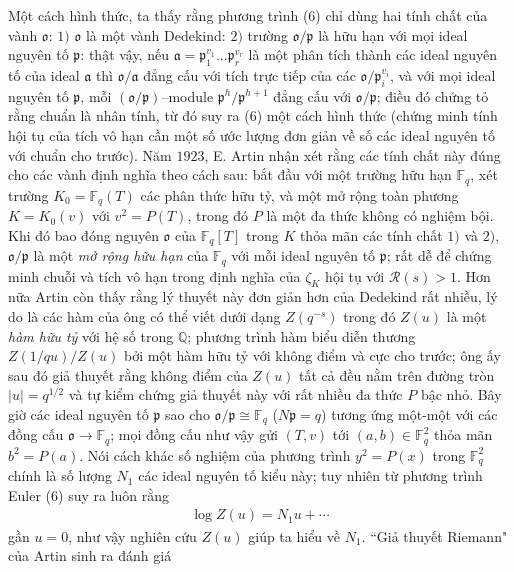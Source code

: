 \begin{multicols}{2}
	\vskip 0.1cm
	Một cách hình thức, ta thấy rằng phương trình ($6$) chỉ dùng hai tính chất của vành $\mathfrak{o}$: $1)$ $\mathfrak{o}$ là một vành Dedekind: $2)$ trường $\mathfrak{o}/\mathfrak{p}$ là hữu hạn với mọi ideal nguyên tố $\mathfrak{p}$: thật vậy, nếu $\mathfrak{a} = \mathfrak{p}_1^{v_1}...\mathfrak{p}_r^{v_r}$ là một phân tích thành các ideal nguyên tố của ideal $\mathfrak{a}$ thì $\mathfrak{o}/\mathfrak{a}$ đẳng cấu với tích trực tiếp của các $\mathfrak{o}/\mathfrak{p}_i^{v_i}$, và với mọi ideal nguyên tố $\mathfrak{p}$, mỗi $(\mathfrak{o}/\mathfrak{p})$--module $\mathfrak{p}^h/\mathfrak{p}^{h+1}$ đẳng cấu với $\mathfrak{o}/\mathfrak{p}$; điều đó chứng tỏ rằng chuẩn là nhân tính, từ đó suy ra ($6$) một cách hình thức (chứng minh tính hội tụ của tích vô hạn cần một số ước lượng đơn giản về số các ideal nguyên tố với chuẩn cho trước). Năm $1923$, E. Artin nhận xét rằng các tính chất này đúng cho các vành định nghĩa theo cách sau: bắt đầu với một trường hữu hạn $\mathbb{F}_q$, xét trường $K_0 = \mathbb{F}_q(T)$ các phân thức hữu tỷ, và một mở rộng toàn phương $K = K_0(v)$ với $v^2=P(T)$, trong đó $P$ là một đa thức không có nghiệm bội. Khi đó bao đóng nguyên $\mathfrak{o}$ của $\mathbb{F}_q[T]$ trong $K$ thỏa mãn các tính chất $1)$ và $2)$, $\mathfrak{o}/\mathfrak{p}$ là một \textit{mở rộng hữu hạn} của $\mathbb{F}_q$ với mỗi ideal nguyên tố $\mathfrak{p}$; rất dễ để chứng minh chuỗi và tích vô hạn trong định nghĩa của $\zeta_K$ hội tụ với $\mathscr{R}(s)>1$. Hơn nữa Artin còn thấy rằng lý thuyết này đơn giản hơn của Dedekind rất nhiều, lý do là các hàm của ông có thể viết dưới dạng $Z(q^{-s})$ trong đó $Z(u)$ là một \textit{hàm hữu tỷ} với hệ số trong $\mathbb{Q}$; phương trình hàm biểu diễn thương $Z(1/qu)/Z(u)$ bởi một hàm hữu tỷ với không điểm và cực cho trước; ông ấy sau đó giả thuyết rằng không điểm của $Z(u)$ tất cả đều nằm trên đường tròn $\left| u \right| = q^{1/2}$ và tự kiểm chứng giả thuyết này với rất nhiều đa thức $P$ bậc nhỏ. 
	\vskip 0.1cm
	Bây giờ các ideal nguyên tố $\mathfrak{p}$ sao cho $\mathfrak{o}/\mathfrak{p} \cong \mathbb{F}_q$ ($N\mathfrak{p}=q$) tương ứng một-một với các đồng cấu $\mathfrak{o} \to \mathbb{F}_q$; mọi đồng cấu như vậy gửi $(T,v)$ tới $(a,b) \in \mathbb{F}_q^2$ thỏa mãn $b^2=P(a)$. Nói cách khác số nghiệm của phương trình $y^2 = P(x)$ trong $\mathbb{F}_q^2$ chính là số lượng $N_1$ các ideal nguyên tố kiểu này; tuy nhiên từ phương trình Euler ($6$) suy ra luôn rằng 
	\begin{align*} 
		\log Z(u) = N_1 u + \cdots 
	\end{align*}
	gần $u=0$, như vậy nghiên cứu $Z(u)$ giúp ta hiểu về $N_1$. ``Giả thuyết Riemann" của Artin sinh ra đánh giá

\end{multicols}
